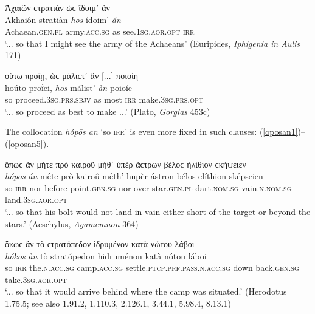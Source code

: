 \begin{exe}
\ex Ἀχαιῶν ϲτρατιὰν ὡϲ ἴδοιμ᾽ ἄν\\
\gll Akhaiôn stratiàn \emph{hōs} ídoim' \emph{án}\\
Achaean.\textsc{gen.pl} army.\textsc{acc.sg} as see.\textsc{1sg.aor.opt} \textsc{irr}\\
\trans `... so that I might see the army of the Achaeans' (Euripides, \textit{Iphigenia in Aulis} 171)
\label{hosan18}
\end{exe}

\begin{exe}
\ex οὕτω προΐῃ, ὡϲ μάλιϲτ᾽ ἂν {[}...{]} ποιοίη\\
\gll hoútō proḯēi, \emph{hōs} málist' \emph{àn} poioíē\\
so proceed.\textsc{3sg.prs.sbjv} as most \textsc{irr} make.\textsc{3sg.prs.opt}\\
\trans `... so proceed as best to make ...' (Plato, \textit{Gorgias} 453c)
\label{hosan19}
\end{exe}

The collocation \emph{hópōs an} `so \textsc{irr}' is even more fixed in such clauses: (\ref{oposan1})--(\ref{oposan5}).\label{oposan}

\begin{exe}
\ex ὅπωϲ ἄν μήτε πρὸ καιροῦ μήθ᾽ ὑπὲρ ἄϲτρων βέλοϲ ἠλίθιον ϲκήψειεν\\
\gll \emph{hópōs} \emph{án} mḗte prò kairoû mḗth' hupèr ástrōn bélos ēlíthion skḗpseien\\
so \textsc{irr} nor before point.\textsc{gen.sg} nor over star.\textsc{gen.pl} dart.\textsc{nom.sg} vain.\textsc{n.nom.sg} land.\textsc{3sg.aor.opt}\\
\trans `... so that his bolt would not land in vain either short of the target or beyond the stars.' (Aeschylus, \textit{Agamemnon} 364)
\label{oposan1}
\end{exe}

\begin{exe}
\ex ὅκωϲ ἂν τὸ ϲτρατόπεδον ἱδρυμένον κατὰ νώτου λάβοι\\
\gll \emph{hókōs} \emph{àn} tò stratópedon hidruménon katà nṓtou láboi\\
so \textsc{irr} the.\textsc{n.acc.sg} camp.\textsc{acc.sg}
settle.\textsc{ptcp.prf.pass.n.acc.sg} down back.\textsc{gen.sg} take.\textsc{3sg.aor.opt}\\
\trans `... so that it would arrive behind where the camp was
situated.' (Herodotus 1.75.5; see also 1.91.2, 1.110.3, 2.126.1, 3.44.1, 5.98.4, 8.13.1)
\label{oposan2}
\end{exe}


